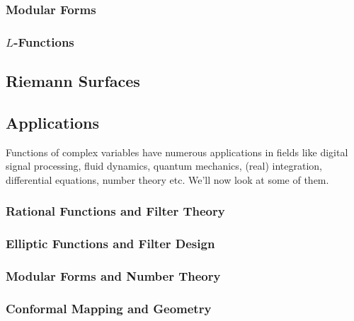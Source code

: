 



\subsubsection{Modular Forms}






\subsubsection{$L$-Functions}






\subsection{Riemann Surfaces}



\subsection{Applications}
Functions of complex variables have numerous applications in fields like digital signal processing, fluid dynamics, quantum mechanics, (real) integration, differential equations, number theory etc. We'll now look at some of them.

\subsubsection{Rational Functions and Filter Theory}

\subsubsection{Elliptic Functions and Filter Design}

\subsubsection{Modular Forms and Number Theory}

\subsubsection{Conformal Mapping and Geometry}


